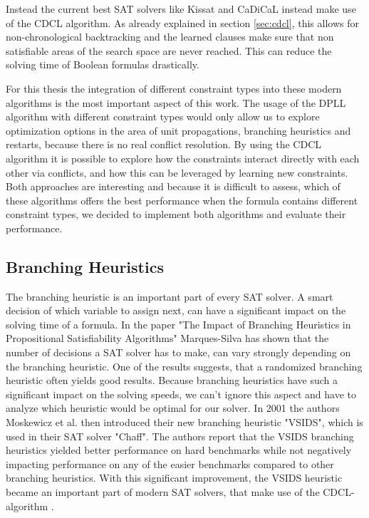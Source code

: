 Instead the current best SAT solvers like Kissat \cite{BiereFazekasFleuryHeisinger-SAT-Competition-2020-solvers} and CaDiCaL \cite{Biere-SAT-Competition-2017-solvers} instead make use of the CDCL algorithm. As already explained in section \ref{sec:cdcl}, this allows for non-chronological backtracking and the learned clauses make sure that non satisfiable areas of the search space are never reached. This can reduce the solving time of Boolean formulas drastically. 

For this thesis the integration of different constraint types into these modern algorithms is the most important aspect of this work. The usage of the DPLL algorithm with different constraint types would only allow us to explore optimization options in the area of unit propagations, branching heuristics and restarts, because there is no real conflict resolution. By using the CDCL algorithm it is possible to explore how the constraints interact directly with each other via conflicts, and how this can be leveraged by learning new constraints. Both approaches are interesting and because it is difficult to assess, which of these algorithms offers the best performance when the formula contains different constraint types, we decided to implement both algorithms and evaluate their performance.

\subsection{Branching Heuristics}

The branching heuristic is an important part of every SAT solver. A smart decision of which variable to assign next, can have a significant impact on the solving time of a formula. In the paper "The Impact of Branching Heuristics in
Propositional Satisfiability Algorithms" \cite{marques1999impact} Marques-Silva has shown that the number of decisions a SAT solver has to make, can vary strongly depending on the branching heuristic. One of the results suggests, that a randomized branching heuristic often yields good results. Because branching heuristics have such a significant impact on the solving speeds, we can't ignore this aspect and have to analyze which heuristic would be optimal for our solver. In 2001 the authors Moskewicz et al. \cite{moskewicz2001chaff} then introduced their new branching heuristic "VSIDS", which is used in their SAT solver "Chaff". The authors report that the VSIDS branching heuristics yielded better performance on hard benchmarks while not negatively impacting performance on any of the easier benchmarks \cite{moskewicz2001chaff} compared to other branching heuristics. With this significant improvement, the VSIDS heuristic became an important part of modern SAT solvers, that make use of the CDCL-algorithm \cite{biere2015evaluating}. 

